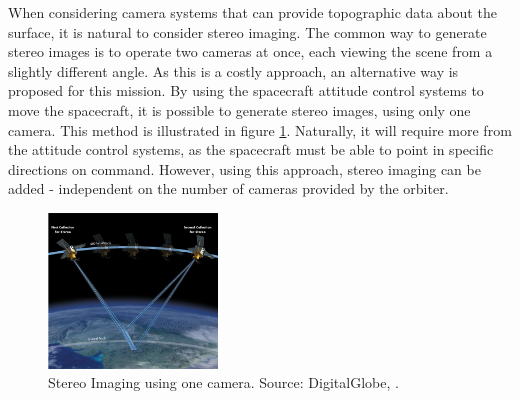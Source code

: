 When considering camera systems that can provide topographic data about the surface, it is natural to consider stereo imaging. The common way to generate stereo images is to operate two cameras at once, each viewing the scene from a slightly different angle. As this is a costly approach, an alternative way is proposed for this mission. By using the spacecraft attitude control systems to move the spacecraft, it is possible to generate stereo images, using only one camera. This method is illustrated in figure \ref{fig:stereoimg}. Naturally, it will require more from the attitude control systems, as the spacecraft must be able to point in specific directions on command. However, using this approach, stereo imaging can be added - independent on the number of cameras provided by the orbiter.

\begin{figure}[htb!]
\centering
\includegraphics[width=0.4\textwidth]{figures/Orbiter/Stereo_Satellite.png}
\caption{Stereo Imaging using one camera. Source: DigitalGlobe, \cite{satimgcorp2015}.}
\label{fig:stereoimg}
\end{figure}

